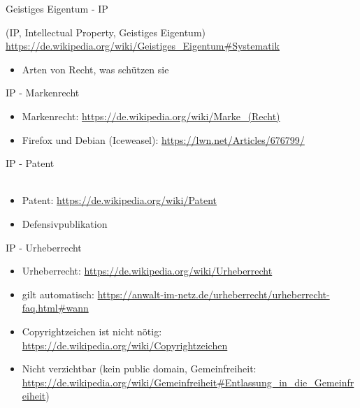 \begin{frame}
\begin{center}
Geistiges Eigentum - IP
\end{center}
\end{frame}
\note
{
(IP, Intellectual Property, Geistiges Eigentum) \url{https://de.wikipedia.org/wiki/Geistiges\_Eigentum\#Systematik}
  \begin{itemize}
    \item Arten von Recht, was schützen sie
  \end{itemize}
}

\begin{frame}[fragile]{IP - Markenrecht}
\end{frame}
\note
{
  \begin{itemize}
    \item Markenrecht: \url{https://de.wikipedia.org/wiki/Marke_(Recht)}
    \item Firefox und Debian (Iceweasel): \url{https://lwn.net/Articles/676799/}
  \end{itemize}
}

\begin{frame}{IP - Patent}
  \\
  \\
\end{frame}
\note
{
  \begin{itemize}
    \item Patent: \url{https://de.wikipedia.org/wiki/Patent}
    \item Defensivpublikation
  \end{itemize}
}

\begin{frame}{IP - Urheberrecht}
  \\
  \todo{\textcopyright}
\end{frame}
\note
{
  \begin{itemize}
    \item Urheberrecht: \url{https://de.wikipedia.org/wiki/Urheberrecht}
    \item gilt automatisch: \url{https://anwalt-im-netz.de/urheberrecht/urheberrecht-faq.html\#wann}
    \item Copyrightzeichen ist nicht nötig: \url{https://de.wikipedia.org/wiki/Copyrightzeichen}
    \item Nicht verzichtbar (kein public domain, Gemeinfreiheit: \url{https://de.wikipedia.org/wiki/Gemeinfreiheit\#Entlassung\_in\_die\_Gemeinfreiheit})
  \end{itemize}
}

